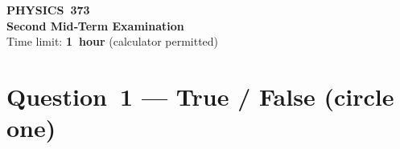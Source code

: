\documentclass[12pt]{article}
\begin{document}
\begin{center}
  {\Large\bfseries PHYSICS 373 \\
               Second Mid‑Term Examination}\\[2ex]
  Time limit: \textbf{1 hour} \quad (calculator permitted)
\end{center}

\newpage










\newpage
\section*{Question 1 — True / False (circle one)}
\end{document}

